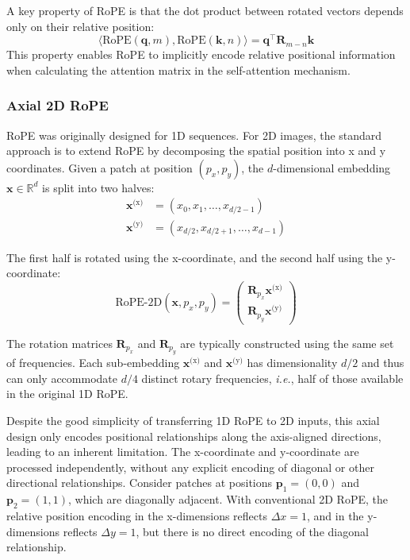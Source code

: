 A key property of RoPE is that the dot product between rotated vectors depends only on their relative position:
\begin{equation}
    \langle \text{RoPE}(\mathbf{q}, m), \text{RoPE}(\mathbf{k}, n) \rangle = \mathbf{q}^\top \mathbf{R}_{m-n} \mathbf{k}
    \label{eq:rope_relative}
\end{equation}
This property enables RoPE to implicitly encode relative positional information when calculating the attention matrix in the self-attention mechanism.

\subsubsection{Axial 2D RoPE}

RoPE was originally designed for 1D sequences. For 2D images, the standard approach is to extend RoPE by decomposing the spatial position into x and y coordinates. Given a patch at position $(p_x, p_y)$, the $d$-dimensional embedding $\mathbf{x} \in \mathbb{R}^d$ is split into two halves:
\begin{align}
    \mathbf{x}^{\text{(x)}} &= (x_0, x_1, \ldots, x_{d/2-1}) \\
    \mathbf{x}^{\text{(y)}} &= (x_{d/2}, x_{d/2+1}, \ldots, x_{d-1})
\end{align}

The first half is rotated using the x-coordinate, and the second half using the y-coordinate:
\begin{equation}
    \text{RoPE-2D}(\mathbf{x}, p_x, p_y) = \begin{pmatrix}
        \mathbf{R}_{p_x} \mathbf{x}^{\text{(x)}} \\
        \mathbf{R}_{p_y} \mathbf{x}^{\text{(y)}}
    \end{pmatrix}
\end{equation}

The rotation matrices $\mathbf{R}_{p_x}$ and $\mathbf{R}_{p_y}$ are typically constructed using the same set of frequencies. Each sub-embedding
$\mathbf{x}^{\text{(x)}}$ and $\mathbf{x}^{\text{(y)}}$ has dimensionality $d/2$ and thus can only accommodate $d/4$ distinct rotary frequencies, \emph{\emph{i.e.}}, half of those available in the original 1D RoPE.

Despite the good simplicity of transferring 1D RoPE to 2D inputs, this axial design only encodes positional relationships along the axis-aligned directions, leading to an inherent limitation. The x-coordinate and y-coordinate are processed independently, without any explicit encoding of diagonal or other directional relationships. Consider patches at positions $\mathbf{p}_1 = (0, 0)$ and $\mathbf{p}_2 = (1, 1)$, which are diagonally adjacent. With conventional 2D RoPE, the relative position encoding in the x-dimensions reflects $\Delta x = 1$, and in the y-dimensions reflects $\Delta y = 1$, but there is no direct encoding of the diagonal relationship.

